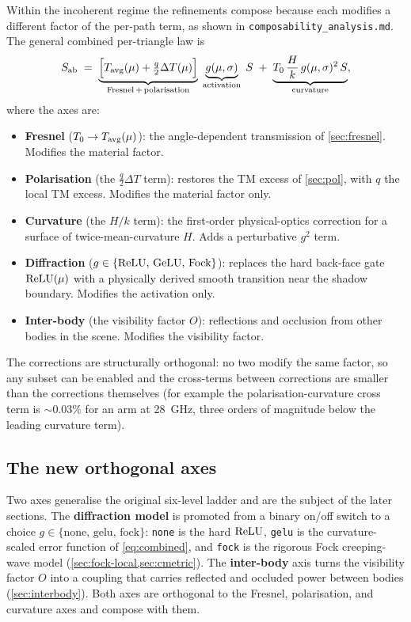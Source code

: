 Within the incoherent regime the refinements compose because each modifies a
different factor of the per-path term, as shown in
\texttt{composability\_analysis.md}. The general combined per-triangle law is
\begin{equation}\label{eq:combined}
  S_{\mathrm{ab}} \;=\; \underbrace{\Bigl[T_{\mathrm{avg}}(\mu)+\tfrac{q}{2}\Delta T(\mu)\Bigr]}_{\text{Fresnel}\,+\,\text{polarisation}}
  \;\underbrace{g(\mu,\sigma)}_{\text{activation}}\;S
  \;+\;\underbrace{T_0\,\frac{H}{k}\,g(\mu,\sigma)^2\,S}_{\text{curvature}},
\end{equation}
where the axes are:
\begin{itemize}[leftmargin=1.4em,itemsep=1pt]
  \item \textbf{Fresnel} ($T_0\to T_{\mathrm{avg}}(\mu)$): the angle-dependent transmission
    of \cref{sec:fresnel}. Modifies the material factor.
  \item \textbf{Polarisation} (the $\tfrac{q}{2}\Delta T$ term): restores the
    TM excess of \cref{sec:pol}, with $q$ the local TM excess. Modifies the
    material factor only.
  \item \textbf{Curvature} (the $H/k$ term): the first-order physical-optics
    correction for a surface of twice-mean-curvature $H$. Adds a perturbative
    $g^2$ term.
  \item \textbf{Diffraction} ($g\in\{\operatorname{ReLU},\,\mathrm{GeLU},\,\text{Fock}\}$):
    replaces the hard back-face gate $\operatorname{ReLU}(\mu)$ with a physically derived
    smooth transition near the shadow boundary. Modifies the activation only.
  \item \textbf{Inter-body} (the visibility factor $O$): reflections and
    occlusion from other bodies in the scene. Modifies the visibility factor.
\end{itemize}
The corrections are structurally orthogonal: no two modify the same factor, so
any subset can be enabled and the cross-terms between corrections are smaller
than the corrections themselves (for example the polarisation-curvature cross
term is $\sim0.03\%$ for an arm at \SI{28}{\giga\hertz}, three orders of
magnitude below the leading curvature term).

\subsection{The new orthogonal axes}\label{sec:new-axes}

Two axes generalise the original six-level ladder and are the subject of the
later sections. The \textbf{diffraction model} is promoted from a binary
on/off switch to a choice $g\in\{\text{none},\,\text{gelu},\,\text{fock}\}$:
\texttt{none} is the hard $\operatorname{ReLU}$, \texttt{gelu} is the curvature-scaled error
function of \cref{eq:combined}, and \texttt{fock} is the rigorous Fock
creeping-wave model (\cref{sec:fock-local,sec:cmetric}). The
\textbf{inter-body} axis turns the visibility factor $O$ into a coupling that
carries reflected and occluded power between bodies (\cref{sec:interbody}).
Both axes are orthogonal to the Fresnel, polarisation, and curvature axes and
compose with them.

